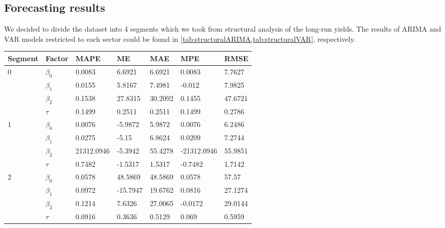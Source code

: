     \subsection{Forecasting results}
        We decided to divide the dataset into 4 segments which we took from structural analysis of the long-run yields. The results of ARIMA and VAR models restricted to each sector could be found in \cref{tab:structuralARIMA,tab:structuralVAR}, respectively.
        \begin{table}[htbp]
            \centering
            \begin{tabular}{|l|l|l|l|l|l|l|}
            \hline
            Segment            & Factor    & MAPE       & ME       & MAE     & MPE         & RMSE    \\ \hline
            \multirow{4}{*}{0} & $\beta_0$ & 0.0083     & 6.6921   & 6.6921  & 0.0083      & 7.7627  \\ \cline{2-7} 
                               & $\beta_1$ & 0.0155     & 5.8167   & 7.4981  & -0.012      & 7.9825  \\ \cline{2-7} 
                               & $\beta_2$ & 0.1538     & 27.8315  & 30.2092 & 0.1455      & 47.6721 \\ \cline{2-7} 
                               & $\tau$    & 0.1499     & 0.2511   & 0.2511  & 0.1499      & 0.2786  \\ \hline
            \multirow{4}{*}{1} & $\beta_0$ & 0.0076     & -5.9872  & 5.9872  & 0.0076      & 6.2486  \\ \cline{2-7} 
                               & $\beta_1$ & 0.0275     & -5.15    & 6.8624  & 0.0209      & 7.2744  \\ \cline{2-7} 
                               & $\beta_2$ & 21312.0946 & -5.3942  & 55.4278 & -21312.0946 & 55.9851 \\ \cline{2-7} 
                               & $\tau$    & 0.7482     & -1.5317  & 1.5317  & -0.7482     & 1.7142  \\ \hline
            \multirow{4}{*}{2} & $\beta_0$ & 0.0578     & 48.5869  & 48.5869 & 0.0578      & 57.57   \\ \cline{2-7} 
                               & $\beta_1$ & 0.0972     & -15.7947 & 19.6762 & 0.0816      & 27.1274 \\ \cline{2-7} 
                               & $\beta_2$ & 0.1214     & 7.6326   & 27.0065 & -0.0172     & 29.0144 \\ \cline{2-7} 
                               & $\tau$    & 0.0916     & 0.3636   & 0.5129  & 0.069       & 0.5959  \\ \hline

\end{tabular}
\end{table}
